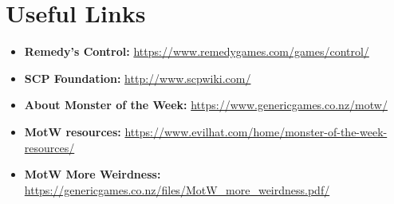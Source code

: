 \documentclass[12pt,oneside,landscape]{memoir}
\begin{document}
\chapter*{Useful Links}
\begin{itemize}

\item \textbf{Remedy’s Control:} \url{https://www.remedygames.com/games/control/}
\item \textbf{SCP Foundation:} \url{http://www.scpwiki.com/}
\item \textbf{About Monster of the Week:} \url{https://www.genericgames.co.nz/motw/}
\item \textbf{MotW resources:} \url{https://www.evilhat.com/home/monster-of-the-week-resources/}
\item \textbf{MotW More Weirdness:} \url{https://genericgames.co.nz/files/MotW_more_weirdness.pdf/}

\end{itemize}
\pagebreak
\end{document}
